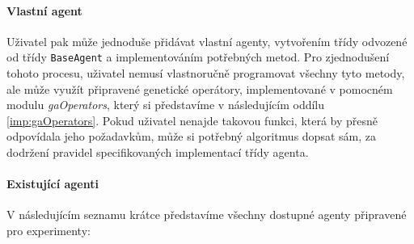 \paragraph{Vlastní agent}
Uživatel pak může jednoduše přidávat vlastní agenty, vytvořením třídy odvozené
od třídy \texttt{BaseAgent} a implementováním potřebných metod. Pro
zjednodušení tohoto procesu, uživatel nemusí vlastnoručně programovat všechny
tyto metody, ale může využít připravené genetické operátory, implementované v
pomocném modulu \emph{gaOperators}, který si představíme v následujícím oddílu
\ref{imp:gaOperators}. Pokud uživatel nenajde takovou funkci, která by přesně
odpovídala jeho požadavkům, může si potřebný algoritmus dopsat sám, za dodržení
pravidel specifikovaných implementací třídy agenta.

\paragraph{Existující agenti}
V následujícím seznamu krátce představíme všechny dostupné agenty připravené
pro experimenty:

